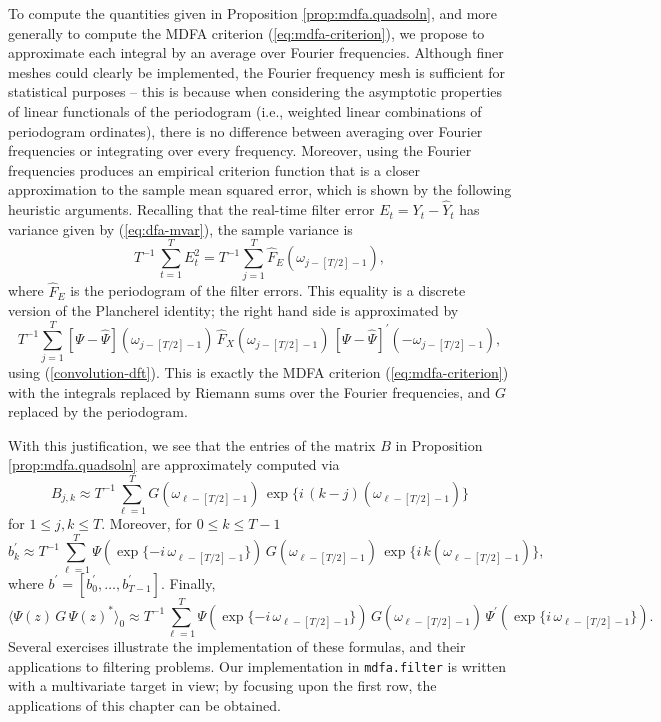 \documentclass[a4paper]{book}
\begin{document}
\vspace{.5cm}

To compute the quantities given in Proposition \ref{prop:mdfa.quadsoln}, and more
 generally to compute the MDFA criterion (\ref{eq:mdfa-criterion}), we propose 
 to approximate each integral by an average over Fourier frequencies.  
 Although finer meshes could clearly be implemented, the Fourier frequency mesh
 is sufficient for statistical purposes -- this is because when considering
 the asymptotic properties of linear functionals of the periodogram (i.e.,
 weighted linear combinations of periodogram ordinates), there is no difference
 between averaging over Fourier frequencies or integrating over every frequency.
 Moreover, using the Fourier frequencies produces an empirical criterion function
 that is a closer approximation to the sample mean squared error, which is shown
 by the following heuristic arguments.  Recalling that the real-time filter error
 $E_t = Y_t - \widehat{Y}_t$ has variance given by (\ref{eq:dfa-mvar}), the sample 
 variance is
\[
  T^{-1} \, \sum_{t=1}^T E_t^2 = T^{-1} \sum_{j=1}^T \widehat{F}_E (\omega_{j-[T/2]-1}),
\]
 where $\widehat{F}_E$ is the periodogram of the filter errors.  This equality
 is a discrete version of the Plancherel identity; the right hand side is approximated
 by 
\[
 T^{-1} \sum_{j=1}^T \left[ \Psi - \widehat{\Psi} \right](\omega_{j-[T/2]-1}) \,
   \widehat{F}_X (\omega_{j-[T/2]-1}) \,
 {\left[ \Psi - \widehat{\Psi} \right]}^{\prime} (-\omega_{j-[T/2]-1}),
\]
  using (\ref{convolution-dft}).  This is exactly the MDFA criterion
 (\ref{eq:mdfa-criterion}) with the integrals replaced by Riemann
 sums over the Fourier frequencies, and $G$ replaced by the periodogram.

With this justification, we see that the entries of the matrix $B$ in 
 Proposition \ref{prop:mdfa.quadsoln} are approximately computed via
\[
  B_{j,k} \approx T^{-1} \sum_{\ell=1}^T G (\omega_{\ell-[T/2]-1}) \,
   \exp \{ i \, (k-j) (\omega_{\ell-[T/2]-1}) \}
\]
 for $1 \leq j,k \leq T$.  Moreover, for $0 \leq k \leq T-1$
\[
  b_k^{\prime} \approx T^{-1}  \sum_{\ell=1}^T \Psi 
	( \exp\{ -i \,\omega_{\ell-[T/2]-1} \}) \,
     G (\omega_{\ell-[T/2]-1}) \,
   \exp \{ i \, k (\omega_{\ell-[T/2]-1}) \},
\]
 where $b^{\prime} = [ b_0^{\prime}, \ldots, b_{T-1}^{\prime} ]$.  Finally,
\[
  { \langle \Psi (z) \, G \, { \Psi (z) }^* \rangle }_0 \approx
  T^{-1}  \sum_{\ell=1}^T \Psi 
	( \exp\{ -i \,\omega_{\ell-[T/2]-1} \}) \,
     G (\omega_{\ell-[T/2]-1}) \,  \Psi^{\prime} 
	( \exp\{ i \,\omega_{\ell-[T/2]-1} \}).
\]
 Several exercises illustrate the implementation of these formulas,
 and their applications to filtering problems.  Our implementation
 in {\tt mdfa.filter} is written with a multivariate target in view;
 by focusing upon the first row, the applications of this chapter 
 can be obtained. 
\end{document}
